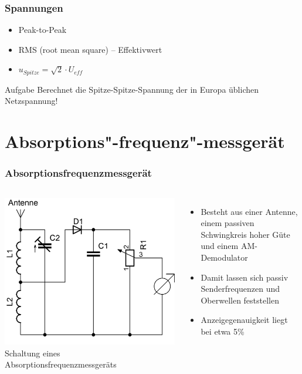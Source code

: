 \begin{frame}
  \frametitle{Spannungen}
  \begin{center}
    \begin{itemize}
      \item Peak-to-Peak
      \item RMS (root mean square) -- Effektivwert
      \item $u_{Spitze} = \sqrt{2} \cdot U_{eff}$ \\
    \end{itemize}
  \end{center}
  \begin{exampleblock}{Aufgabe}
    Berechnet die Spitze-Spitze-Spannung der in Europa üblichen Netzspannung!
  \end{exampleblock}
\end{frame}

\section*{Absorptions"-frequenz"-messgerät}
\begin{frame}
  \frametitle{Absorptionsfrequenzmessgerät}
  \begin{columns}
    \begin{center}
      \includegraphics[width=\textwidth,height=.8\textheight,keepaspectratio]{a16/Absorptionsfrequenzmesser.png}\\
      {\tiny Schaltung eines Absorptionsfrequenzmessgeräts}
    \end{center}
    \begin{itemize}
      \item Besteht aus einer Antenne, einem passiven Schwingkreis hoher Güte und  einem AM-Demodulator
      \item Damit lassen sich passiv Senderfrequenzen und Oberwellen feststellen
      \item Anzeigegenauigkeit liegt bei etwa 5\%
    \end{itemize}
  \end{columns}
\end{frame}

